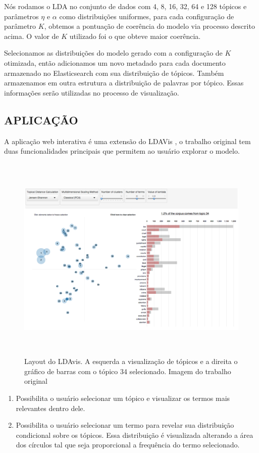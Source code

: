 \documentclass[12pt,a4paper]{article}
\begin{document}
Nós rodamos o LDA no conjunto de dados com 4, 8, 16, 32, 64 e 128 tópicos e parâmetros $\eta$ e $\alpha$ como distribuições uniformes, para cada configuração de parâmetro $K$, obtemos a pontuação de coerência do modelo via processo descrito acima. O valor de $K$ utilizado foi o que obteve maior coerência.

Selecionamos as distribuições do modelo gerado com a configuração de $K$ otimizada, então adicionamos um novo metadado para cada documento armazenado no Elasticsearch com sua distribuição de tópicos. Também armazenamos em outra estrutura a distribuição de palavras por tópico. Essas informações serão utilizadas no processo de visualização.

\subsection{APLICAÇÃO}
A aplicação web interativa é uma extensão do LDAVis \cite{sievert2014ldavis}, o trabalho original tem duas funcionalidades principais
que permitem ao usuário explorar o modelo.

\begin{figure}[h]
	\centering
    \includegraphics[height=10cm]{images/figure_4.png}
    \caption{Layout do LDAvis. A esquerda a visualização de tópicos e a direita o gráfico de barras com o tópico 34 selecionado. Imagem do trabalho original \cite{sievert2014ldavis}}
\end{figure}


\begin{enumerate}
  \item Possibilita o usuário selecionar um tópico e visualizar os termos mais relevantes dentro dele.
  \item Possibilita o usuário selecionar um termo para revelar sua distribuição condicional sobre os tópicos. Essa distribuição
  é visualizada alterando a área dos círculos tal que seja proporcional a frequência do termo selecionado.
\end{enumerate}
\end{document}
